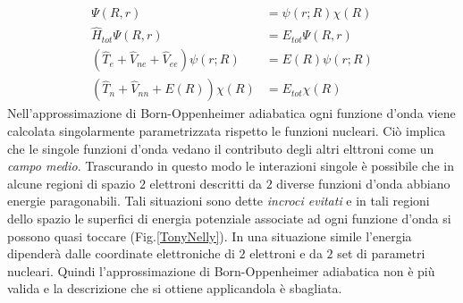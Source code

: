 \documentclass[oneside]{amsbook}
\numberwithin{section}{chapter}
\numberwithin{equation}{section}
\numberwithin{figure}{section}
\begin{document}
\begin{equation}
\begin{aligned}
\Psi(R,r)&=\psi(r;R)\chi(R) \\
\hat{H}_{tot}\Psi(R,r)&=E_{tot}\Psi(R,r) \\
(\hat{T}_e + \hat{V}_{ne} +\hat{V}_{ee})\psi(r;R) &= E(R)\psi(r;R) \\
(\hat{T}_n + \hat{V}_{nn}+E(R))\chi(R)&= E_{tot}\chi(R)
\end{aligned}
\end{equation}
Nell'approssimazione di Born-Oppenheimer adiabatica ogni funzione d'onda viene calcolata singolarmente parametrizzata rispetto le funzioni nucleari. Ciò implica che le singole funzioni d'onda vedano il contributo degli altri elttroni come un \emph{campo medio}. Trascurando in questo modo le interazioni singole è possibile che in alcune regioni di spazio $2$ elettroni descritti da $2$ diverse funzioni d'onda abbiano energie paragonabili. Tali situazioni sono dette \emph{incroci evitati} e in tali regioni dello spazio le superfici di energia potenziale associate ad ogni funzione d'onda si possono quasi toccare (Fig.\ref{TonyNelly}). In una situazione simile l'energia dipenderà dalle coordinate elettroniche di $2$ elettroni e da $2$ set di parametri nucleari. Quindi l'approssimazione di Born-Oppenheimer adiabatica non è più valida e la descrizione che si ottiene applicandola è sbagliata.
\end{document}
